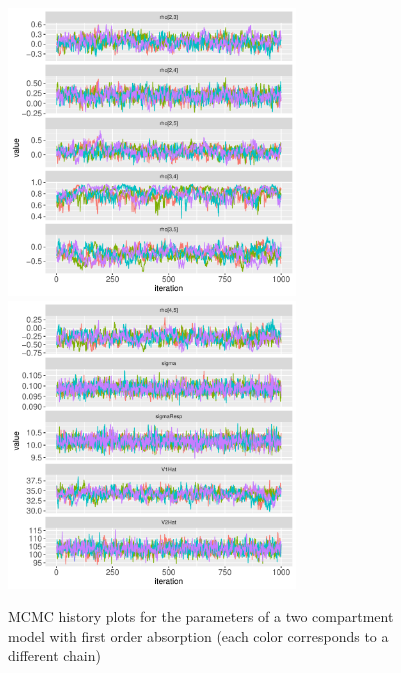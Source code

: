 \documentclass[11pt]{amsart}
\begin{document}
\begin{figure}[htbp]
\includegraphics[width=3.0in,trim=0in 0in 0 0in]{graphics/effCptModelTorsten/effCptModelTorstenPlots004.pdf}
\includegraphics[width=3.0in,trim=0in 0in 0 0in]{graphics/effCptModelTorsten/effCptModelTorstenPlots005.pdf}
\caption{{MCMC history plots for the parameters of a two compartment model with first order absorption (each color corresponds to a different chain)}}
\label{MCMC1}
\end{figure}
\end{document}
